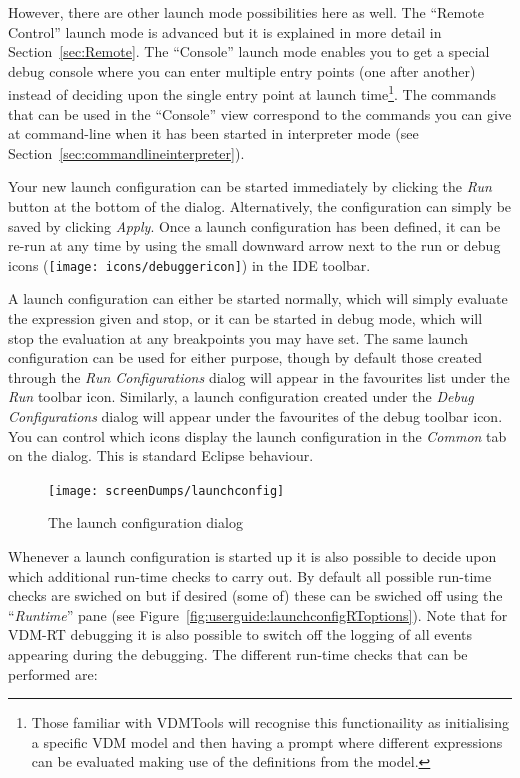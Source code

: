 \documentclass{overturerepchap}
\begin{document}
However, there are other launch mode possibilities here as
well. The
``Remote Control'' launch mode is advanced but it is explained in more
detail in Section~\ref{sec:Remote}. The ``Console'' launch mode
enables you to get a special debug console where you can enter
multiple entry points (one after another) instead of deciding upon the
single entry point at launch time\footnote{Those familiar with
  VDMTools will recognise this functionaility as initialising a
  specific VDM model and then having a prompt where different
  expressions can be evaluated making use of the definitions from the model.}.
The commands that can be used in the ``Console'' view correspond to
the commands you can give at command-line when it has been started in
interpreter mode (see Section~\ref{sec:commandlineinterpreter}).

Your new launch configuration can be started immediately by clicking the \emph{Run}
button at the bottom of the dialog. Alternatively, the configuration can simply be
saved by clicking \emph{Apply}. Once a launch configuration has been defined, it
can be re-run at any time by using the small downward arrow next to the run or
debug icons (\texttt{[image: icons/debuggericon]})
in the IDE toolbar.

A launch configuration can either be started normally, which will simply evaluate
the expression given and stop, or it can be started in debug mode, which will
stop the evaluation at any breakpoints you may have set. The same launch configuration
can be used for either purpose, though by default those created through the
\emph{Run Configurations} dialog will appear in the favourites list under the
\emph{Run} toolbar icon. Similarly, a launch configuration created under the
\emph{Debug Configurations} dialog will appear under the favourites of the
debug toolbar icon. You can control which icons display the launch configuration
in the \emph{Common} tab on the dialog. This is standard Eclipse behaviour.


\begin{figure}[htp]
\begin{center}
  \texttt{[image: screenDumps/launchconfig]}
  \caption{The launch configuration dialog}
  \label{fig:userguide:launchconfig}
\end{center}
\end{figure}

Whenever a launch configuration is started up it is also possible to
decide upon which additional run-time checks to carry out. By default
all possible run-time checks are swiched on but if desired (some of)
these can be swiched off using the ``\emph{Runtime}'' pane (see
Figure~\ref{fig:userguide:launchconfigRToptions}). Note that for
VDM-RT debugging it is also possible to switch off the logging of all
events appearing during the debugging. The different run-time checks
that can be performed are:
\end{document}
